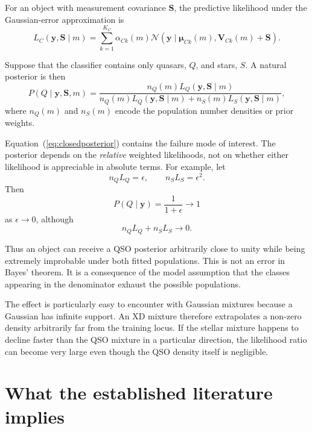 \documentclass[11pt]{article}
\begin{document}
For an object with measurement covariance $\bm{S}$, the predictive likelihood
under the Gaussian-error approximation is
%
\begin{equation}
L_C(\bm{y},\bm{S}\mid m)
=
\sum_{k=1}^{K_C}
\alpha_{Ck}(m)
\mathcal{N}
\left(
\bm{y}\mid
\bm{\mu}_{Ck}(m),
\bm{V}_{Ck}(m)+\bm{S}
\right).
\label{eq:xdlike}
\end{equation}

Suppose that the classifier contains only quasars, $Q$, and stars, $S$. A
natural posterior is then
%
\begin{equation}
P(Q\mid\bm{y},\bm{S},m)
=
\frac{
n_Q(m)L_Q(\bm{y},\bm{S}\mid m)
}{
n_Q(m)L_Q(\bm{y},\bm{S}\mid m)
+
n_S(m)L_S(\bm{y},\bm{S}\mid m)
},
\label{eq:closedposterior}
\end{equation}
%
where $n_Q(m)$ and $n_S(m)$ encode the population number densities or prior
weights.

Equation~(\ref{eq:closedposterior}) contains the failure mode of interest. The
posterior depends on the \emph{relative} weighted likelihoods, not on whether
either likelihood is appreciable in absolute terms. For example, let
%
\begin{equation}
n_Q L_Q = \epsilon,
\qquad
n_S L_S = \epsilon^2 .
\end{equation}
%
Then
%
\begin{equation}
P(Q\mid\bm{y})
=
\frac{1}{1+\epsilon}
\longrightarrow 1
\end{equation}
%
as $\epsilon\rightarrow 0$, although
%
\begin{equation}
n_Q L_Q+n_S L_S\longrightarrow 0 .
\end{equation}

Thus an object can receive a QSO posterior arbitrarily close to unity while
being extremely improbable under both fitted populations. This is not an
error in Bayes' theorem. It is a consequence of the model assumption that the
classes appearing in the denominator exhaust the possible populations.

The effect is particularly easy to encounter with Gaussian mixtures because
a Gaussian has infinite support. An XD mixture therefore extrapolates a
non-zero density arbitrarily far from the training locus. If the stellar
mixture happens to decline faster than the QSO mixture in a particular
direction, the likelihood ratio can become very large even though the QSO
density itself is negligible.

\section{What the established literature implies}
\end{document}
